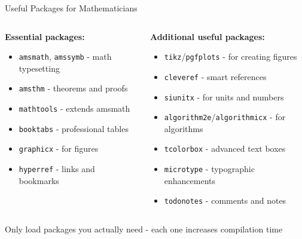 \begin{frame}[fragile]{Useful Packages for Mathematicians}
	\begin{columns}
		\begin{column}{0.5\textwidth}
			\textbf{Essential packages:}
			\begin{itemize}
				\item \texttt{amsmath}, \texttt{amssymb} - math typesetting
				\item \texttt{amsthm} - theorems and proofs
				\item \texttt{mathtools} - extends amsmath
				\item \texttt{booktabs} - professional tables
				\item \texttt{graphicx} - for figures
				\item \texttt{hyperref} - links and bookmarks
			\end{itemize}
		\end{column}
		
		\begin{column}{0.5\textwidth}
			\textbf{Additional useful packages:}
			\begin{itemize}
				\item \texttt{tikz}/\texttt{pgfplots} - for creating figures
				\item \texttt{cleveref} - smart references
				\item \texttt{siunitx} - for units and numbers
				\item \texttt{algorithm2e}/\texttt{algorithmicx} - for algorithms
				\item \texttt{tcolorbox} - advanced text boxes
				\item \texttt{microtype} - typographic enhancements
				\item \texttt{todonotes} - comments and notes
			\end{itemize}
		\end{column}
	\end{columns}
	
	\begin{tip}
		Only load packages you actually need - each one increases compilation time
	\end{tip}
\end{frame}

